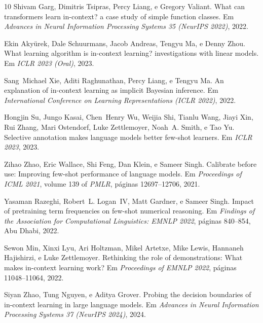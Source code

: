 \documentclass[12pt,a4paper]{article}
\begin{document}
\begin{thebibliography}{10}
Shivam Garg, Dimitris Tsipras, Percy Liang, e Gregory Valiant.
\newblock What can transformers learn in-context? a case study of simple
  function classes.
\newblock Em \emph{Advances in Neural Information Processing Systems 35
  (NeurIPS 2022)}, 2022.

Ekin Akyürek, Dale Schuurmans, Jacob Andreas, Tengyu Ma, e Denny Zhou.
\newblock What learning algorithm is in-context learning? investigations with
  linear models.
\newblock Em \emph{ICLR 2023 (Oral)}, 2023.

Sang~Michael Xie, Aditi Raghunathan, Percy Liang, e Tengyu Ma.
\newblock An explanation of in-context learning as implicit {B}ayesian
  inference.
\newblock Em \emph{International Conference on Learning Representations (ICLR
  2022)}, 2022.

Hongjin Su, Jungo Kasai, Chen~Henry Wu, Weijia Shi, Tianlu Wang, Jiayi Xin,
  Rui Zhang, Mari Ostendorf, Luke Zettlemoyer, Noah~A. Smith, e Tao Yu.
\newblock Selective annotation makes language models better few-shot learners.
\newblock Em \emph{ICLR 2023}, 2023.

Zihao Zhao, Eric Wallace, Shi Feng, Dan Klein, e Sameer Singh.
\newblock Calibrate before use: Improving few-shot performance of language
  models.
\newblock Em \emph{Proceedings of ICML 2021}, volume 139 of \emph{PMLR},
  páginas 12697--12706, 2021.

Yasaman Razeghi, Robert~L. Logan~IV, Matt Gardner, e Sameer Singh.
\newblock Impact of pretraining term frequencies on few-shot numerical
  reasoning.
\newblock Em \emph{Findings of the Association for Computational Linguistics:
  EMNLP 2022}, páginas 840--854, Abu Dhabi, 2022.

Sewon Min, Xinxi Lyu, Ari Holtzman, Mikel Artetxe, Mike Lewis, Hannaneh
  Hajishirzi, e Luke Zettlemoyer.
\newblock Rethinking the role of demonstrations: What makes in-context learning
  work?
\newblock Em \emph{Proceedings of EMNLP 2022}, páginas 11048--11064, 2022.

Siyan Zhao, Tung Nguyen, e Aditya Grover.
\newblock Probing the decision boundaries of in-context learning in large
  language models.
\newblock Em \emph{Advances in Neural Information Processing Systems 37
  (NeurIPS 2024)}, 2024.


\end{thebibliography}
\end{document}
